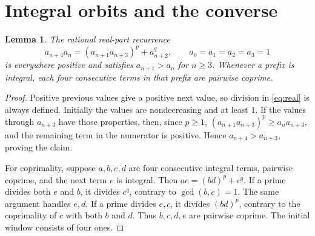 \documentclass[11pt]{article}
\newtheorem{lemma}[theorem]{Lemma}
\begin{document}
\section{Integral orbits and the converse}
\begin{lemma}\label{lem:real}
The rational real-part recurrence
\begin{equation}\label{eq:real}
 a_{n+4}a_n=(a_{n+1}a_{n+3})^p+a_{n+2}^q,\qquad
 a_0=a_1=a_2=a_3=1
\end{equation}
is everywhere positive and satisfies $a_{n+1}>a_n$ for $n\ge3$.
Whenever a prefix is integral, each four consecutive terms in that
prefix are pairwise coprime.
\end{lemma}
\begin{proof}
Positive previous values give a positive next value, so division in
\eqref{eq:real} is always defined. Initially the values are nondecreasing
and at least $1$. If the values through $a_{n+3}$ have those properties,
then, since $p\ge1$,
$(a_{n+1}a_{n+3})^p\ge a_na_{n+3}$, and the remaining term in the
numerator is positive. Hence $a_{n+4}>a_{n+3}$, proving the claim.

For coprimality, suppose $a,b,c,d$ are four consecutive integral
terms, pairwise coprime, and the next term $e$ is integral. Then
$ae=(bd)^p+c^q$. If a prime divides both $e$ and $b$, it divides
$c^q$, contrary to $\gcd(b,c)=1$. The same argument handles $e,d$.
If a prime divides $e,c$, it divides $(bd)^p$, contrary to the
coprimality of $c$ with both $b$ and $d$. Thus $b,c,d,e$ are
pairwise coprime. The initial window consists of four ones.
\end{proof}
\end{document}
